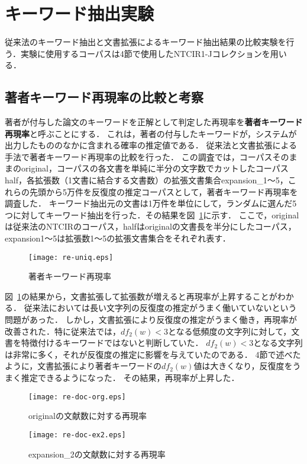 \documentclass[japanese]{jnlp_1.2c}
\begin{document}
\section{キーワード抽出実験}
従来法のキーワード抽出と文書拡張によるキーワード抽出結果の比較実験を行う．実験に使用するコーパスは4節で使用したNTCIR1-Jコレクションを用いる．
\subsection{著者キーワード再現率の比較と考察}
著者が付与した論文のキーワードを正解として判定した再現率を{\bf 著者キーワード再現率}と呼ぶことにする．
これは，著者の付与したキーワードが，システムが出力したもののなかに含まれる確率の推定値である．
従来法と文書拡張による手法で著者キーワード再現率の比較を行った．
この調査では，コーパスそのままのoriginal，コーパスの各文書を単純に半分の文字数でカットしたコーパスhalf，各拡張数（1文書に結合する文書数）の拡張文書集合expansion\_1〜5，これらの先頭から5万件を反復度の推定コーパスとして，著者キーワード再現率を調査した．
キーワード抽出元の文書は1万件を単位にして，ランダムに選んだ5つに対してキーワード抽出を行った．その結果を図~\ref{fig:re-uniq}に示す．
ここで，originalは従来法のNTCIRのコーパス，halfはoriginalの文書長を半分にしたコーパス，expansion1〜5は拡張数1〜5の拡張文書集合をそれぞれ表す．

\begin{figure}[b]
	\begin{center}
		\texttt{[image: re-uniq.eps]}
	\end{center}
	\caption{著者キーワード再現率}
	\label{fig:re-uniq}
\end{figure}

図~\ref{fig:re-uniq}の結果から，文書拡張して拡張数が増えると再現率が上昇することがわかる．
従来法においては長い文字列の反復度の推定がうまく働いていないという問題があった．
しかし，文書拡張により反復度の推定がうまく働き，再現率が改善された．特に従来法では，$df_2(w)<3$となる低頻度の文字列に対して，文書を特徴付けるキーワードではないと判断していた．
$df_2(w)<3$となる文字列は非常に多く，それが反復度の推定に影響を与えていたのである．
4節で述べたように，文書拡張により著者キーワードの$df_2(w)$値は大きくなり，反復度をうまく推定できるようになった．
その結果，再現率が上昇した．

\begin{figure}[p]
	\begin{center}
		\texttt{[image: re-doc-org.eps]}
	\end{center}
	\caption{originalの文献数に対する再現率}
	\label{fig:re-doc-org}
\vspace{1\baselineskip}
	\begin{center}
		\texttt{[image: re-doc-ex2.eps]}
	\end{center}
	\caption{expansion\_2の文献数に対する再現率}
	\label{fig:re-doc-ex2}
\end{figure}
\end{document}
